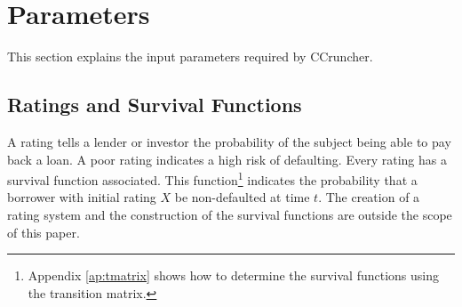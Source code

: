 \documentclass[a4paper,12pt,final]{article}
\begin{document}

\section{Parameters}

This section explains the input parameters required by CCruncher.

\subsection{Ratings and Survival Functions}
A rating tells a lender or investor the probability of the subject being 
able to pay back a loan. A poor rating indicates a high risk of defaulting.
Every rating has a survival function associated. This function\footnote{
Appendix \ref{ap:tmatrix} shows how to determine the survival functions 
using the transition matrix.} indicates the probability that a borrower with 
initial rating $X$ be non-defaulted at time $t$. The creation of a rating 
system and the construction of the survival functions are outside the scope 
of this paper.
\end{document}
